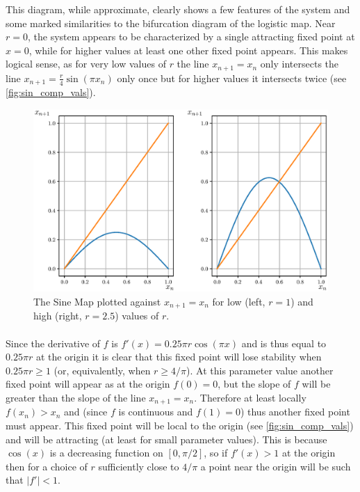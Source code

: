 \documentclass{article}
\begin{document}
This diagram, while approximate, clearly shows a few features of the system and some marked 
similarities to the bifurcation diagram of the logistic map. Near $r = 0$, the system appears 
to be characterized by a single attracting fixed point at $x = 0$, while for higher values 
at least one other fixed point appears. This makes logical sense, as 
for very low values of $r$ the line $x_{n+1} = x_n$ only intersects the line $x_{n+1} = \frac{r}{4}\sin(\pi x_n)$ 
only once but for higher values it intersects twice (see \autoref{fig:sin_comp_vals}).

\begin{figure}[H]
    \centering
    \includegraphics[scale = 0.6]{Figure_7.eps}
	\caption{The Sine Map plotted against $x_{n+1} = x_n$ for low (left, $r = 1$) and high (right, $r = 2.5$) 
    values of $r$.}
    \label{fig:sin_comp_vals}
\end{figure}

\paragraph{}
Since the derivative of $f$ is $f'(x) = 0.25\pi r \cos(\pi x)$ and is thus equal to $0.25\pi r$ at the origin  
it is clear that this fixed point will lose stability when $0.25\pi r \geq 1$ (or, equivalently, 
when $r \geq 4/\pi$). At this parameter value another fixed point will appear as
at the origin $f(0) = 0$, but the slope of $f$ will be greater than the slope of the line 
$x_{n+1} = x_n$. Therefore at least locally $f(x_n) > x_n$ and (since $f$ is continuous and 
$f(1) = 0$) thus another fixed point must appear. This fixed point will be local to the origin 
(see \autoref{fig:sin_comp_vals}) and 
will be attracting (at least for small parameter values). This is because $\cos(x)$ is a decreasing 
function on $[0,\pi/2]$, so if $f'(x) > 1$ at the origin then for a choice of $r$ sufficiently 
close to $4/\pi$ a point near the origin will be such that $|f'| < 1$. 
\end{document}

